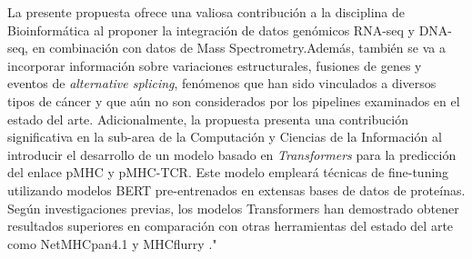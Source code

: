 \documentclass[a4paper,11pt]{article}
\begin{document}
La presente propuesta ofrece una valiosa contribución a la disciplina de Bioinformática al proponer la integración de datos genómicos RNA-seq y DNA-seq, en combinación con datos de Mass Spectrometry.Además, también se va a incorporar información sobre variaciones estructurales, fusiones de genes y eventos de \textit{alternative splicing}, fenómenos que han sido vinculados a diversos tipos de cáncer \cite{wood2020neoepiscope} y que aún no son considerados por los pipelines examinados en el estado del arte. Adicionalmente, la propuesta presenta una contribución significativa en la sub-area de la Computación y Ciencias de la Información al introducir el desarrollo de un modelo basado en \textit{Transformers} para la predicción del enlace pMHC y pMHC-TCR. Este modelo empleará técnicas de fine-tuning utilizando modelos BERT pre-entrenados en extensas bases de datos de proteínas. Según investigaciones previas, los modelos Transformers han demostrado obtener resultados superiores en comparación con otras herramientas del estado del arte como NetMHCpan4.1 \cite{reynisson2020netmhcpan} y MHCflurry \cite{o2020mhcflurry}."





\end{document}
